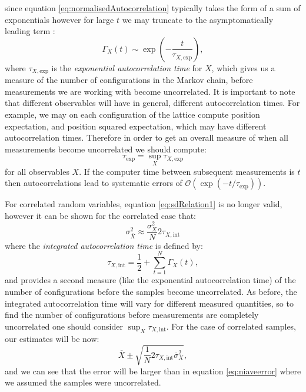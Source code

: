 \documentclass[12pt]{article}
\begin{document}
            since equation \ref{eq:normalisedAutocorrelation} typically takes the form of a sum of exponentials however for  large $t$  we may truncate to the asymptomatically leading term \cite{gattringer_lang_2013}:
            \begin{equation}
                \Gamma_{X}\left(t\right)\sim\exp\left(-\frac{t}{\tau_{X,\text{exp}}}\right),
            \end{equation}
            where $\tau_{X,\text{exp}}$ is the \textit{exponential autocorrelation time} for $X$, which gives us a measure of the number of configurations in the Markov chain, before measurements we are working with become uncorrelated. It is important to note that different observables will have in general, different autocorrelation times. For example, we may on each configuration of the lattice compute position expectation, and position squared expectation, which may have different autocorrelation times. Therefore in order to get an overall measure of when all measurements become uncorrelated we should compute:
            \begin{equation}
                \tau_{\text{exp}}=\sup_{X} \tau_{X,\text{exp}}
            \end{equation}
            for all observables $X$. If the computer time between subsequent measurements is $t$ then autocorrelations lead to systematic errors of $\mathcal{O}\left(\exp{\left( - t / \tau_{\text{exp}}\right)}\right)$\cite{gattringer_lang_2013}.

            For correlated random variables, equation \ref{eq:sdRelation1} is no longer valid, however it can be shown for the correlated case \cite{gattringer_lang_2013} that:
            \begin{equation}
                \sigma_{\overline{X}}^2 \approx \frac{\sigma_X^2}{N} 2 \tau_{X,\text{int}}
            \end{equation}
            where the \textit{integrated autocorrelation time} is defined by:
            \begin{equation}
                \label{eq:integratedAutocorrelation}
                \tau_{X,\text{int}} = \frac{1}{2} + \sum_{t=1}^{N}\Gamma_{X}\left(t\right),
            \end{equation}
            and provides  a second measure (like the exponential autocorrelation time) of the number of configurations before the samples become uncorrelated. As before, the integrated autocorrelation time will vary for different measured quantities, so to find the number of configurations before measurements are completely uncorrelated one should consider $\sup_X{\tau_{X,\text{int}}}$. 
            For the case of correlated samples, our estimates will be now:
            \begin{equation}
                \label{eq:trueEstimate}
                \overline{X}\pm\sqrt{\frac{1}{N}2\tau_{X,\text{int}}\overline{\sigma}^{2}_{X}},
            \end{equation}
            and we can see that the error will be larger than in equation \ref{eq:niaveerror} where we assumed the samples were uncorrelated. 
\end{document}
